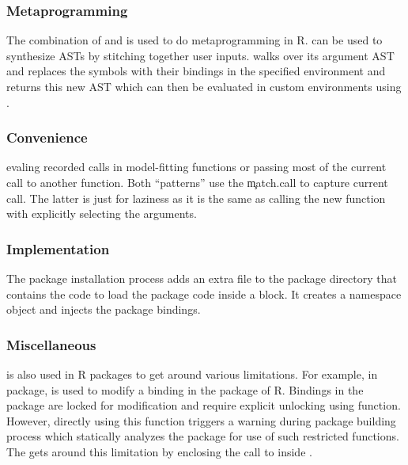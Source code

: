 \documentclass[conference]{IEEEtran}
\begin{document}
  \subsubsection{Metaprogramming} The combination of \eval and \substitute is
  used to do metaprogramming in R. \substitute can be used to synthesize ASTs by
  stitching together user inputs. \substitute walks over its argument AST and
  replaces the symbols with their bindings in the specified environment and
  returns this new AST which can then be evaluated in custom environments using
  \eval.

  \subsubsection{Convenience}
  evaling recorded calls in model-fitting functions or passing most of the
  current call to another function. Both ``patterns'' use the \c{match.call} to
  capture current call. The latter is just for laziness as it is the same as
  calling the new function with explicitly selecting the arguments.

  \subsubsection{Implementation}
  The package installation process adds an extra file to the package directory
  that contains the code to load the package code inside a \local block. It
  creates a namespace object and injects the package bindings.

  \subsubsection{Miscellaneous} \eval is also used in R packages to get around
  various limitations. For example, in \datatable package, \eval is used to modify
  a binding in the \base package of R. Bindings in the \base package are locked
  for modification and require explicit unlocking using \unlockBinding function.
  However, directly using this function triggers a warning during package building
  process which statically analyzes the package for use of such restricted
  functions. The \datatable gets around this limitation by enclosing the call to
  \unlockBinding inside \eval.
\end{document}
